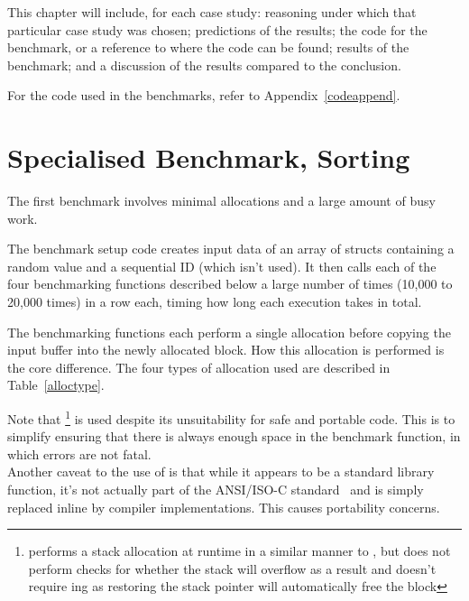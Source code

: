 This chapter will include, for each case study: reasoning under which that particular case study was chosen; predictions of the results; the code for the benchmark, or a reference to where the code can be found; results of the benchmark; and a discussion of the results compared to the conclusion.

For the code used in the benchmarks, refer to Appendix~\ref{codeappend}.

\section{Specialised Benchmark, Sorting}

The first benchmark involves minimal allocations and a large amount of busy work.

The benchmark setup code creates input data of an array of structs containing a random value and a sequential ID (which isn't used). It then calls each of the four benchmarking functions described below a large number of times (10,000 to 20,000 times) in a row each, timing how long each execution takes in total.

The benchmarking functions each perform a single allocation before copying the input buffer into the newly allocated block. How this allocation is performed is the core difference. The four types of allocation used are described in Table~\ref{alloctype}.

Note that \footnote{ performs a stack allocation at runtime in a similar manner to \malloc{}, but does not perform checks for whether the stack will overflow as a result and doesn't require \free{}ing as restoring the stack pointer will automatically free the block} is used despite its unsuitability for safe and portable code. This is to simplify ensuring that there is always enough space in the  benchmark function, in which errors are not fatal.\\
Another caveat to the use of  is that while it appears to be a standard library function, it's not actually part of the ANSI/ISO-C standard~\cite{c11std} and is simply replaced inline by compiler implementations. This causes portability concerns.

